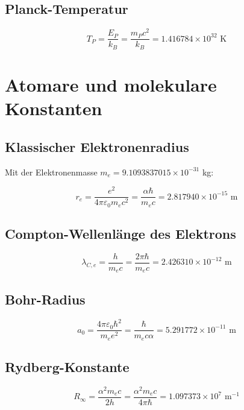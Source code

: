 \documentclass[12pt,a4paper]{article}
\theoremstyle{definition}
\begin{document}
	\subsection{Planck-Temperatur}
	
	\begin{equation}
		T_P = \frac{E_P}{k_B} = \frac{m_P c^2}{k_B} = 1.416784 \times 10^{32} \text{ K}
	\end{equation}
	
	\section{Atomare und molekulare Konstanten}
	
	\subsection{Klassischer Elektronenradius}
	
	Mit der Elektronenmasse $m_e = 9.1093837015 \times 10^{-31}$ kg:
	
	\begin{equation}
		r_e = \frac{e^2}{4\pi\varepsilon_0 m_e c^2} = \frac{\alpha \hbar}{m_e c} = 2.817940 \times 10^{-15} \text{ m}
	\end{equation}
	
	\subsection{Compton-Wellenl\"ange des Elektrons}
	
	\begin{equation}
		\lambda_{C,e} = \frac{h}{m_e c} = \frac{2\pi\hbar}{m_e c} = 2.426310 \times 10^{-12} \text{ m}
	\end{equation}
	
	\subsection{Bohr-Radius}
	
	\begin{equation}
		a_0 = \frac{4\pi\varepsilon_0\hbar^2}{m_e e^2} = \frac{\hbar}{m_e c \alpha} = 5.291772 \times 10^{-11} \text{ m}
	\end{equation}
	
	\subsection{Rydberg-Konstante}
	
	\begin{equation}
		R_\infty = \frac{\alpha^2 m_e c}{2h} = \frac{\alpha^2 m_e c}{4\pi\hbar} = 1.097373 \times 10^7 \text{ m}^{-1}
	\end{equation}
	
\end{document}
